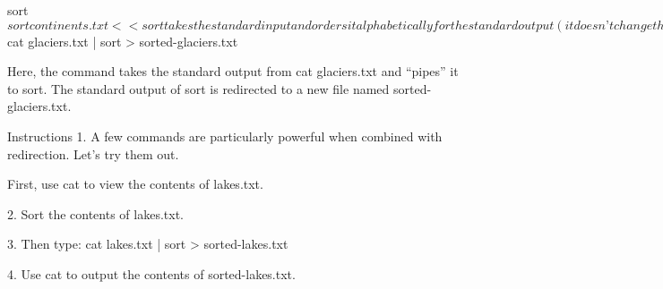 sort
        $ sort continents.txt 
    
    <<sort takes the standard input and orders it alphabetically for the standard output (it doesn’t change the file itself)>>. Here, the continents in continents.txt will be listed in alphabetical order:
        Africa
        Antarctica
        Asia
        Australia
        Europe
        North America
        South America

        $ cat glaciers.txt | sort > sorted-glaciers.txt 
    
    Here, the command takes the standard output from cat glaciers.txt and “pipes” it to sort. The standard output of sort is redirected to a new file named sorted-glaciers.txt.

Instructions
    1.
    A few commands are particularly powerful when combined with redirection. Let’s try them out.

    First, use cat to view the contents of lakes.txt.

    2.
    Sort the contents of lakes.txt.

    3.
    Then type:
        cat lakes.txt | sort > sorted-lakes.txt 

    4.
    Use cat to output the contents of sorted-lakes.txt.